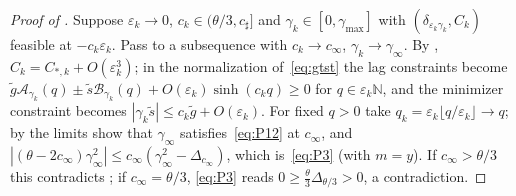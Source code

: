 \documentclass[11pt]{article}
\theoremstyle{definition}
\theoremstyle{remark}
\newcommand{\N}{\mathbb N}
\newcommand{\cA}{\mathcal A}
\newcommand{\cB}{\mathcal B}
\newcommand{\sh}{\sinh}
\newcommand{\gt}{\tilde g}
\newcommand{\st}{\tilde s}
\begin{document}
\begin{proof}[Proof of ]
Suppose \(\varepsilon_k\to0\), \(c_k\in(\theta/3,c_\sharp]\) and \(\gamma_k\in[0,\gamma_{\max}]\) with
\((\delta_{\varepsilon_k\gamma_k},C_k)\) feasible at \(-c_k\varepsilon_k\).  Pass to a subsequence with
\(c_k\to c_\infty\), \(\gamma_k\to\gamma_\infty\).  By ,
\(C_k=C_{*,k}+O(\varepsilon_k^3)\); in the normalization of~\eqref{eq:gtst} the lag
constraints become
\(\gt\cA_{\gamma_k}(q)\pm\st\cB_{\gamma_k}(q)+O(\varepsilon_k)\sh(c_kq)\ge0\) for \(q\in\varepsilon_k\N\), and
the minimizer constraint becomes \(|\gamma_k\st|\le c_k\gt+O(\varepsilon_k)\).  For fixed
\(q>0\) take \(q_k=\varepsilon_k\lfloor q/\varepsilon_k\rfloor\to q\); by  the limits
show that \(\gamma_\infty\) satisfies~\eqref{eq:P12} at \(c_\infty\), and \(|(\theta-2c_\infty)\gamma_\infty^2|\le c_\infty(\gamma_\infty^2-\Delta_{c_\infty})\), which
is~\eqref{eq:P3} (with \(m=y\)).  If \(c_\infty>\theta/3\) this contradicts ; if \(c_\infty=\theta/3\),
\eqref{eq:P3} reads \(0\ge\frac\theta3\Delta_{\theta/3}>0\), a contradiction.
\end{proof}
\end{document}
